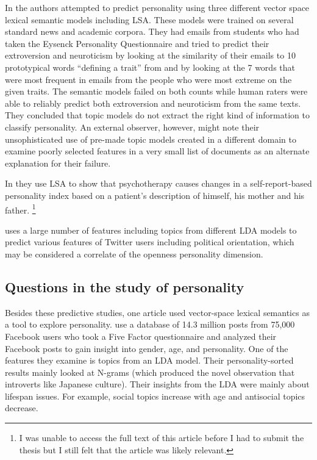 \documentclass[eric_thesis.tex]{subfiles}
\begin{document}
In  the authors attempted to predict personality
using three different vector space lexical semantic models including LSA. These
models were trained on several standard news and academic corpora. They
had emails from students who had taken the Eysenck Personality Questionnaire and
tried to predict their extroversion and neuroticism by looking at the similarity
of their emails to 10 prototypical words ``defining a trait'' from  and
by looking at the 7 words that were most frequent in emails from the people who
were most extreme on the given traits. The semantic models failed on both
counts while human raters were able to reliably predict both extroversion and
neuroticism from the same texts. They concluded that topic models do not
extract the right kind of information to classify personality. An external
observer, however, might note their unsophisticated use of pre-made topic
models created in a different domain to examine poorly selected features in 
a very small list of documents as an alternate explanation for their failure.

In  they use LSA to show that 
psychotherapy causes changes in a self-report-based personality index based 
on a patient's description of himself, his mother and his father.
\footnote{I was unable to access the full text of this article before I
had to submit the thesis but I still felt that the article was likely 
relevant.}

 uses a large number of features including topics
from different LDA models to predict various features of Twitter users including
political orientation, which may be considered a correlate of the openness
personality dimension.

\subsection{Questions in the study of personality}

Besides these predictive studies, one article used vector-space lexical 
semantics as a tool to explore personality.  use a 
database of 14.3 million posts from 75,000 
Facebook users who took a Five Factor questionnaire and analyzed their Facebook 
posts to gain insight into gender, age, and personality. One of the features 
they examine is topics from an LDA model. Their personality-sorted results
mainly looked at N-grams (which produced the novel observation that introverts
like Japanese culture). Their insights from the LDA were mainly about lifespan
issues. For example, social
topics increase with age and antisocial topics decrease.
\end{document}

